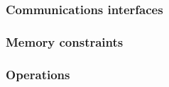
\subsubsection{Communications interfaces}


\subsubsection{Memory constraints}


\subsubsection{Operations}


